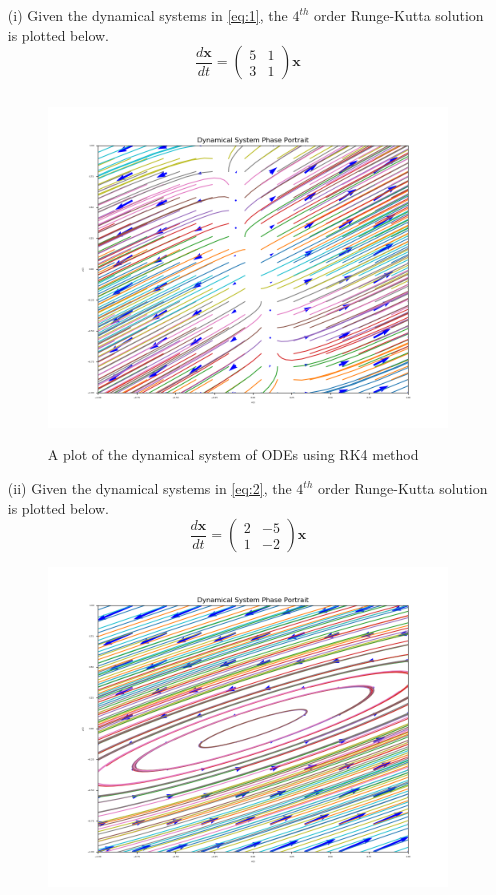 \documentclass[12pt,a4paper]{article}
\begin{document}
\begin{enumerate}
		\item[(i)] Given the dynamical systems in \eqref{eq:1}, the $4^{th}$ order Runge-Kutta solution is plotted below.
				\begin{equation}
						  \frac{d\mathbf{x}}{dt} =  \begin{pmatrix}
		  								5 &  1\\
		  								3 & 1
		  						\end{pmatrix} \mathbf{x}
						\label{eq:1}
			  \end{equation}
					\begin{figure}[!h]
									\includegraphics[width=480pt,  height=260pt]{./graphics/q001_a.png}
										\caption{A plot of the dynamical system of ODEs using RK4 method}
										\label{fig:q1}
								\end{figure}
					\item[(ii)] Given the dynamical systems in \eqref{eq:2}, the $4^{th}$ order Runge-Kutta solution is plotted below.
				\begin{equation}
						  \frac{d\mathbf{x}}{dt} =  \begin{pmatrix}
		  								2 &  -5\\
		  								1  & -2
		  						\end{pmatrix} \mathbf{x}
						\label{eq:2}
			  \end{equation}
					\begin{figure}[!h]
									\includegraphics[width=480pt,  height=240pt]{./graphics/q001_b.png}

\end{figure}
\end{enumerate}
\end{document}
